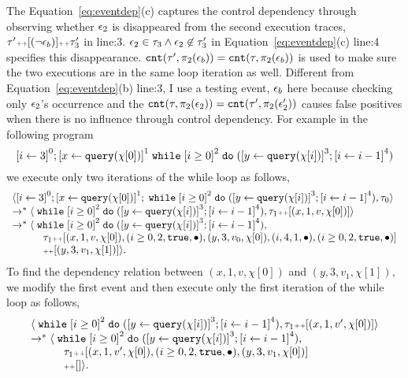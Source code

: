 The Equation~\ref{eq:eventdep}(c) captures the control dependency through observing whether $\mathtt{\epsilon}_2$ is disappeared from the second execution traces, $\mathtt{\tau}' {\scriptscriptstyle ++} [(\neg \mathtt{\epsilon}_b)] {\scriptscriptstyle ++} \mathtt{\tau}_3'$ in line:3.
$\mathtt{\epsilon}_2 \in \mathtt{\tau}_3 \land \mathtt{\epsilon}_2 \not\in \mathtt{\tau}_3'$ in Equation~\ref{eq:eventdep}(c) line:4 specifies this disappearance.
$\mathtt{cnt}(\mathtt{\tau}', \pi_2(\mathtt{\epsilon}_b)) = \mathtt{cnt}(\mathtt{\tau}, \pi_2(\mathtt{\epsilon}_b))$ is used to make sure the two executions are
in the same loop iteration as well.
Different from Equation~\ref{eq:eventdep}(b) line:3,
I use a testing event, $\mathtt{\epsilon}_b$ here because checking only $\mathtt{\epsilon}_2$'s occurrence and the
$\mathtt{cnt}(\mathtt{\tau}, \pi_2(\mathtt{\epsilon}_2)) = \mathtt{cnt}(\mathtt{\tau}', \pi_2(\mathtt{\epsilon}_2'))$
causes false positives
when there is no influence through control dependency. 
For example in the following program
\[
 \clabel{\assign{i}{3}}^{0}; \clabel{\assign{x}{\query(\chi[0])}}^1 \ewhile \clabel{i \geq 0}^{2} \edo ( \clabel{\assign{y}{\query(\chi[i])}}^3; \clabel{\assign{i}{ i - 1}}^{4})
\]
we execute only two iterations of the while loop as follows,
\[
 \begin{array}{l}
 \config{
 \clabel{\assign{i}{3}}^{0}; \clabel{\assign{x}{\query(\chi[0])}}^1; \ewhile \clabel{i \geq 0}^{2} \edo ( \clabel{\assign{y}{\query(\chi[i])}}^3; \clabel{\assign{i}{ i - 1}}^{4}), \trace_0} \\
 \rightarrow^{*} \config{\ewhile \clabel{i \geq 0}^{2} \edo ( \clabel{\assign{y}{\query(\chi[i])}}^3; \clabel{\assign{i}{ i - 1}}^{4}), \trace_1 \tracecat [(x, 1, v, \chi[0])]} \\
 \rightarrow^{*}
 \config{\ewhile \clabel{i \geq 0}^{2} \edo ( \clabel{\assign{y}{\query(\chi[i])}}^3; \clabel{\assign{i}{ i - 1}}^{4}), 
 \\ \qquad \quad \trace_1 \tracecat [(x, 1, v, \chi[0]), (i \geq 0, 2, \etrue, \bullet), (y, 3, v_0, \chi[0]), (i, 4, 1, \bullet), (i \geq 0, 2, \etrue, \bullet)]
 \\ \qquad \quad \tracecat [ (y, 3, v_1, \chi[1]) ]}.
 \end{array} 
\]
To find the dependency relation between $(x, 1, v, \chi[0])$ and $(y, 3, v_1, \chi[1])$, we modify the first event and then execute only the first iteration of the while loop as follows,
\[
 \begin{array}{l}
 \config{\ewhile \clabel{i \geq 0}^{2} \edo ( \clabel{\assign{y}{\query(\chi[i])}}^3; \clabel{\assign{i}{ i - 1}}^{4}), \trace_1 \tracecat [(x, 1, v', \chi[0])]} \\
 \rightarrow^{*}
 \config{\ewhile \clabel{i \geq 0}^{2} \edo ( \clabel{\assign{y}{\query(\chi[i])}}^3; \clabel{\assign{i}{ i - 1}}^{4}),
 \\ \qquad \quad \trace_1 \tracecat [(x, 1, v', \chi[0]), (i \geq 0, 2, \etrue, \bullet), (y, 3, v_1, \chi[0])] 
 \\ \qquad \quad \tracecat[]}.
 \end{array} 
 \]
